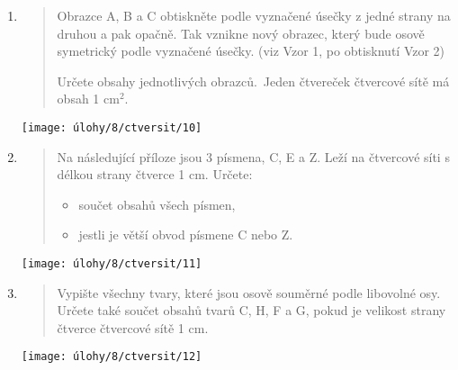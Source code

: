\begin{enumerate}
\begin{minipage}[t]{\linewidth}
    \end{minipage}

    \item
    \begin{minipage}[t]{\linewidth}
        \begin{quote}
            Obrazce A, B a C obtiskněte podle vyznačené úsečky z jedné strany na druhou a pak opačně.
            Tak vznikne nový obrazec, který bude osově symetrický podle vyznačené úsečky.
            (viz
            Vzor 1, po obtisknutí Vzor 2)

            Určete obsahy jednotlivých obrazců.\             Jeden čtvereček čtvercové sítě má obsah 1 cm$^{2}$.
        \end{quote}
        \centering
        \texttt{[image: úlohy/8/ctversit/10]}

    \end{minipage}

    \item
    \begin{minipage}[t]{\linewidth}
        \begin{quote}
            Na následující příloze jsou 3 písmena, C, E a Z. Leží na čtvercové síti s délkou strany čtverce 1 cm. Určete:
            \begin{itemize}
                \item součet obsahů všech písmen,
                \item jestli je větší obvod písmene C nebo Z\@.
            \end{itemize}
        \end{quote}
        \centering
        \texttt{[image: úlohy/8/ctversit/11]}

    \end{minipage}

    \item
    \begin{minipage}[t]{\linewidth}
        \begin{quote}
            Vypište všechny tvary, které jsou osově souměrné podle libovolné osy.
            Určete také součet obsahů tvarů C, H, F a G, pokud je velikost strany čtverce čtvercové sítě 1 cm.
        \end{quote}
        \centering
        \texttt{[image: úlohy/8/ctversit/12]}

    \end{minipage}
\end{enumerate}

